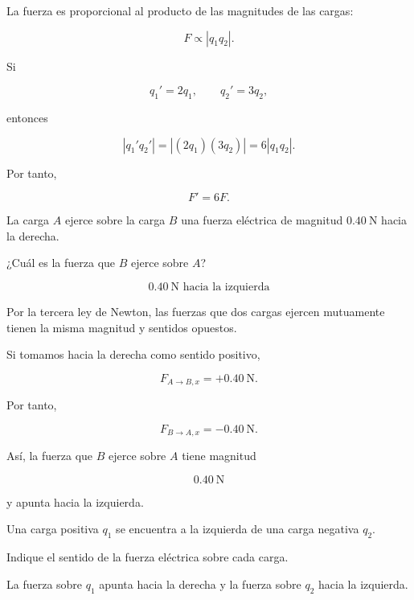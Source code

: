 \begin{explicacion}
La fuerza es proporcional al producto de las magnitudes de las cargas:

\[
F\propto|q_1q_2|.
\]

Si

\[
q_1'=2q_1, \qquad q_2'=3q_2,
\]

entonces

\[
|q_1'q_2'|=|(2q_1)(3q_2)|=6|q_1q_2|.
\]

Por tanto,

\[
\boxed{F'=6F}.
\]
\end{explicacion}


\begin{ejercicio}
La carga \(A\) ejerce sobre la carga \(B\) una fuerza eléctrica de magnitud
\(\SI{0.40}{\newton}\) hacia la derecha.

¿Cuál es la fuerza que \(B\) ejerce sobre \(A\)?
\end{ejercicio}

\begin{respuesta}
\[
\boxed{\SI{0.40}{\newton}\text{ hacia la izquierda}}
\]
\end{respuesta}

\begin{explicacion}
Por la tercera ley de Newton, las fuerzas que dos cargas ejercen mutuamente
tienen la misma magnitud y sentidos opuestos.

Si tomamos hacia la derecha como sentido positivo,

\[
F_{A\to B,x}=+\SI{0.40}{\newton}.
\]

Por tanto,

\[
F_{B\to A,x}=-\SI{0.40}{\newton}.
\]

Así, la fuerza que \(B\) ejerce sobre \(A\) tiene magnitud

\[
\boxed{\SI{0.40}{\newton}}
\]

y apunta hacia la izquierda.
\end{explicacion}


\begin{ejercicio}
Una carga positiva \(q_1\) se encuentra a la izquierda de una carga negativa
\(q_2\).

Indique el sentido de la fuerza eléctrica sobre cada carga.
\end{ejercicio}

\begin{respuesta}
La fuerza sobre \(q_1\) apunta hacia la derecha y la fuerza sobre \(q_2\)
hacia la izquierda.
\end{respuesta}

